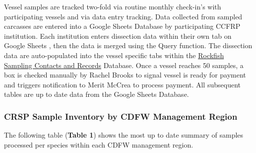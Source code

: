 \documentclass[
  letterpaper,
  DIV=11,
  numbers=noendperiod]{scrartcl}
\begin{document}
Vessel samples are tracked two-fold via routine monthly check-in's with
participating vessels and via data entry tracking. Data collected from
sampled carcasses are entered into a Google Sheets Database by
participating CCFRP institution. Each institution enters dissection data
within their own tab on Google Sheets , then the data is merged using
the Query function. The dissection data are auto-populated into the
vessel specific tabs within the
\href{https://docs.google.com/spreadsheets/d/1hVaB7Wh5BB_hfSLxPLvWwM52cUw4IfROGIHiH_5Y8YM/edit\#gid=1355710864}{Rockfish
Sampling Contacts and Records} Database. Once a vessel reaches 50
samples, a box is checked manually by Rachel Brooks to signal vessel is
ready for payment and triggers notification to Merit McCrea to process
payment. All subsequent tables are up to date data from the Google
Sheets Database.

\hypertarget{crsp-sample-inventory-by-cdfw-management-region}{%
\subsubsection{CRSP Sample Inventory by CDFW Management
Region}\label{crsp-sample-inventory-by-cdfw-management-region}}

The following table (\textbf{Table 1}) shows the most up to date summary
of samples processed per species within each CDFW management region.
\end{document}
